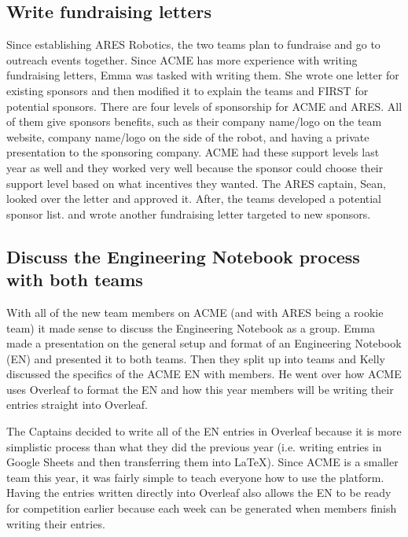 \documentclass{article}
\begin{document}
\subsection{Write fundraising letters}
Since establishing ARES Robotics, the two teams plan to fundraise and go to outreach events together. Since ACME has more experience with writing fundraising letters, Emma was tasked with writing them. She wrote one letter for existing sponsors and then modified it to explain the teams and FIRST for potential sponsors. There are four levels of sponsorship for ACME and ARES. All of them give sponsors benefits, such as their company name/logo on the team website, company name/logo on the side of the robot, and having a private presentation to the sponsoring company. ACME had these support levels last year as well and they worked very well because the sponsor could choose their support level based on what incentives they wanted. The ARES captain, Sean, looked over the letter and approved it. After, the teams developed a potential sponsor list. and wrote another fundraising letter targeted to new sponsors.  

\subsection{Discuss the Engineering Notebook process with both teams}
With all of the new team members on ACME (and with ARES being a rookie team) it made sense to discuss the Engineering Notebook as a group. Emma made a presentation on the general setup and format of an Engineering Notebook (EN) and presented it to both teams. Then they split up into teams and Kelly discussed the specifics of the ACME EN with members. He went over how ACME uses Overleaf to format the EN and how this year members will be writing their entries straight into Overleaf. 

The Captains decided to write all of the EN entries in Overleaf because it is more simplistic process than what they did the previous year (i.e. writing entries in Google Sheets and then transferring them into \LaTeX). Since ACME is a smaller team this year, it was fairly simple to teach everyone how to use the platform. Having the entries written directly into Overleaf also allows the EN to be ready for competition earlier because each week can be generated when members finish writing their entries. 
\end{document}
